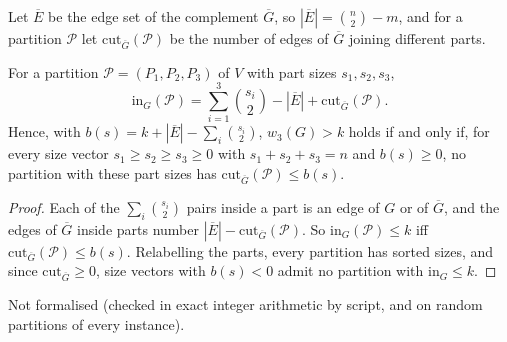 Let $\overline E$ be the edge set of the complement $\overline G$, so
$|\overline E|=\binom n2-m$, and for a partition $\mathcal{P}$ let
$\mathrm{cut}_{\overline G}(\mathcal{P})$ be the number of edges of $\overline G$ joining
different parts.

\begin{proposition}\label{prop:clique-sizes}
For a partition $\mathcal{P}=(P_1,P_2,P_3)$ of $V$ with part sizes $s_1,s_2,s_3$,
\[
  \mathrm{in}_G(\mathcal{P})=\sum_{i=1}^3\binom{s_i}2-|\overline E|+\mathrm{cut}_{\overline G}(\mathcal{P}).
\]
Hence, with $b(s)=k+|\overline E|-\sum_i\binom{s_i}2$, $w_3(G)>k$ holds if and only
if, for every size vector $s_1\ge s_2\ge s_3\ge 0$ with $s_1+s_2+s_3=n$ and
$b(s)\ge 0$, no partition with these part sizes has
$\mathrm{cut}_{\overline G}(\mathcal{P})\le b(s)$.
\end{proposition}
\begin{proof}
Each of the $\sum_i\binom{s_i}2$ pairs inside a part is an edge of $G$ or of
$\overline G$, and the edges of $\overline G$ inside parts number
$|\overline E|-\mathrm{cut}_{\overline G}(\mathcal{P})$. So $\mathrm{in}_G(\mathcal{P})\le k$ iff
$\mathrm{cut}_{\overline G}(\mathcal{P})\le b(s)$. Relabelling the parts, every partition
has sorted sizes, and since $\mathrm{cut}_{\overline G}\ge 0$, size vectors with
$b(s)<0$ admit no partition with $\mathrm{in}_G\le k$.
\end{proof}
\noindent Not formalised (checked in exact integer arithmetic by script, and
on random partitions of every instance).

